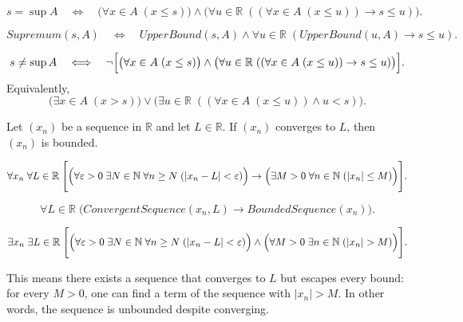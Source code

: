 \begin{remark*}
\[
s = \sup A
\quad\Longleftrightarrow\quad
\bigl(\forall x \in A \; (x \le s)\bigr)
\land
\bigl(\forall u \in \mathbb{R}\; ((\forall x \in A \; (x \le u)) \rightarrow s \le u)\bigr).
\]
\end{remark*}

\begin{remark*}
\[
Supremum(s,A)
\quad\Longleftrightarrow\quad
UpperBound(s,A)
\land
\forall u \in \mathbb{R}\; (UpperBound(u,A) \rightarrow s \le u).
\]
\end{remark*}

\begin{remark*}
\[
s \neq \sup A
\quad\Longleftrightarrow\quad
\neg\Bigl[
\bigl(\forall x \in A \; (x \le s)\bigr)
\land
\bigl(\forall u \in \mathbb{R}\; ((\forall x \in A \; (x \le u)) \rightarrow s \le u)\bigr)
\Bigr].
\]
Equivalently,
\[
\bigl(\exists x \in A \; (x > s)\bigr)
\lor
\bigl(\exists u \in \mathbb{R}\; ((\forall x \in A \; (x \le u)) \land u < s)\bigr).
\]
\end{remark*}






\begin{theorem}
\label{thm:every-convergent-sequence-is-bounded}
Let $(x_n)$ be a sequence in $\mathbb{R}$ and let $L \in \mathbb{R}$. If $(x_n)$ converges
to $L$, then $(x_n)$ is bounded.
\end{theorem}

\begin{remark*}
\[
\forall x_n \; \forall L \in \mathbb{R}\;
\Biggl[
\Bigl(
\forall \varepsilon > 0 \; \exists N \in \mathbb{N} \; \forall n \ge N \;
(|x_n - L| < \varepsilon)
\Bigr)
\rightarrow
\Bigl(
\exists M > 0 \; \forall n \in \mathbb{N} \; (|x_n| \le M)
\Bigr)
\Biggr].
\]
\end{remark*}

\begin{remark*}
\[
\forall L \in \mathbb{R}\;
\bigl(
ConvergentSequence(x_n,L) \rightarrow BoundedSequence(x_n)
\bigr).
\]
\end{remark*}

\begin{remark*}
\[
\exists x_n \; \exists L \in \mathbb{R}\;
\Biggl[
\Bigl(
\forall \varepsilon > 0 \; \exists N \in \mathbb{N} \; \forall n \ge N \;
(|x_n - L| < \varepsilon)
\Bigr)
\land
\Bigl(
\forall M > 0 \; \exists n \in \mathbb{N} \; (|x_n| > M)
\Bigr)
\Biggr].
\]

This means there exists a sequence that converges to $L$ but escapes every bound: for every
$M > 0$, one can find a term of the sequence with $|x_n| > M$. In other words, the sequence
is unbounded despite converging.
\end{remark*}

